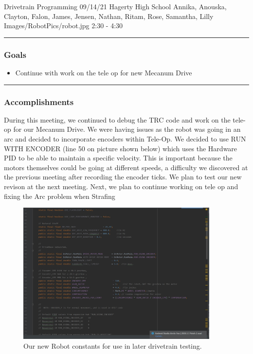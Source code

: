 \insertmeeting 
	{Drivetrain Programming} 
	{09/14/21}
	{Hagerty High School}
	{Annika, Anouska, Clayton, Falon, James, Jensen, Nathan, Ritam, Rose, Samantha, Lilly}
	{Images/RobotPics/robot.jpg}
	{2:30 - 4:30}
	
\noindent\hfil\rule{\textwidth}{.4pt}\hfil
\subsubsection*{Goals}
\begin{itemize}
    \item Continue with work on the tele op for new Mecanum Drive 

\end{itemize} 

\noindent\hfil\rule{\textwidth}{.4pt}\hfil

\subsubsection*{Accomplishments}
During this meeting, we continued to debug the TRC code and work on the tele-op for our Mecanum Drive. We were having issues as the robot was going in an arc and decided to incorporate encoders within Tele-Op. We decided to use RUN WITH ENCODER (line 50 on picture shown below) which uses the Hardware PID to be able to maintain a specific velocity. This is important because the motors themselves could be going at different speeds, a difficulty we discovered at the previous meeting after recording the encoder ticks. We plan to test our new revison at the next meeting. Next, we plan to continue working on tele op and fixing the Arc problem when Strafing

\begin{figure}[htp]
\centering
\includegraphics[width=0.9\textwidth, angle=0]{Meetings/September/09-14-21/09-14-21 1.JPG}
\caption{Our new Robot constants for use in later drivetrain testing.}
\label{fig:pic1}
\end{figure}


